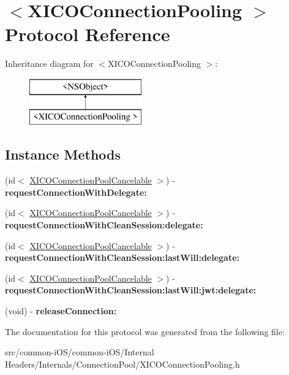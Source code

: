 \hypertarget{protocol_x_i_c_o_connection_pooling_01-p}{}\section{$<$X\+I\+C\+O\+Connection\+Pooling $>$ Protocol Reference}
\label{protocol_x_i_c_o_connection_pooling_01-p}
Inheritance diagram for $<$X\+I\+C\+O\+Connection\+Pooling $>$\+:\begin{figure}[H]
\begin{center}
\leavevmode
\includegraphics[height=2.000000cm]{protocol_x_i_c_o_connection_pooling_01-p}
\end{center}
\end{figure}
\subsection*{Instance Methods}
\begin{DoxyCompactItemize}
\item 
\hypertarget{protocol_x_i_c_o_connection_pooling_01-p_af468f3ed6cdb39e2d61f458dfe4d862a}{}\label{protocol_x_i_c_o_connection_pooling_01-p_af468f3ed6cdb39e2d61f458dfe4d862a} 
(id$<$ \hyperlink{interface_x_i_c_o_connection_pool_cancelable}{X\+I\+C\+O\+Connection\+Pool\+Cancelable} $>$) -\/ {\bfseries request\+Connection\+With\+Delegate\+:}
\item 
\hypertarget{protocol_x_i_c_o_connection_pooling_01-p_aee9079fa0e69b9dace70d66c39532eb3}{}\label{protocol_x_i_c_o_connection_pooling_01-p_aee9079fa0e69b9dace70d66c39532eb3} 
(id$<$ \hyperlink{interface_x_i_c_o_connection_pool_cancelable}{X\+I\+C\+O\+Connection\+Pool\+Cancelable} $>$) -\/ {\bfseries request\+Connection\+With\+Clean\+Session\+:delegate\+:}
\item 
\hypertarget{protocol_x_i_c_o_connection_pooling_01-p_aacf90577bc32e87aa3d28d2571d1f93e}{}\label{protocol_x_i_c_o_connection_pooling_01-p_aacf90577bc32e87aa3d28d2571d1f93e} 
(id$<$ \hyperlink{interface_x_i_c_o_connection_pool_cancelable}{X\+I\+C\+O\+Connection\+Pool\+Cancelable} $>$) -\/ {\bfseries request\+Connection\+With\+Clean\+Session\+:last\+Will\+:delegate\+:}
\item 
\hypertarget{protocol_x_i_c_o_connection_pooling_01-p_a49a12d14f4726a82856eb6097893ce69}{}\label{protocol_x_i_c_o_connection_pooling_01-p_a49a12d14f4726a82856eb6097893ce69} 
(id$<$ \hyperlink{interface_x_i_c_o_connection_pool_cancelable}{X\+I\+C\+O\+Connection\+Pool\+Cancelable} $>$) -\/ {\bfseries request\+Connection\+With\+Clean\+Session\+:last\+Will\+:jwt\+:delegate\+:}
\item 
\hypertarget{protocol_x_i_c_o_connection_pooling_01-p_a90f3938d126c49befa676f7d6de8da88}{}\label{protocol_x_i_c_o_connection_pooling_01-p_a90f3938d126c49befa676f7d6de8da88} 
(void) -\/ {\bfseries release\+Connection\+:}
\end{DoxyCompactItemize}


The documentation for this protocol was generated from the following file\+:\begin{DoxyCompactItemize}
\item 
src/common-\/i\+O\+S/common-\/i\+O\+S/\+Internal Headers/\+Internals/\+Connection\+Pool/X\+I\+C\+O\+Connection\+Pooling.\+h\end{DoxyCompactItemize}
